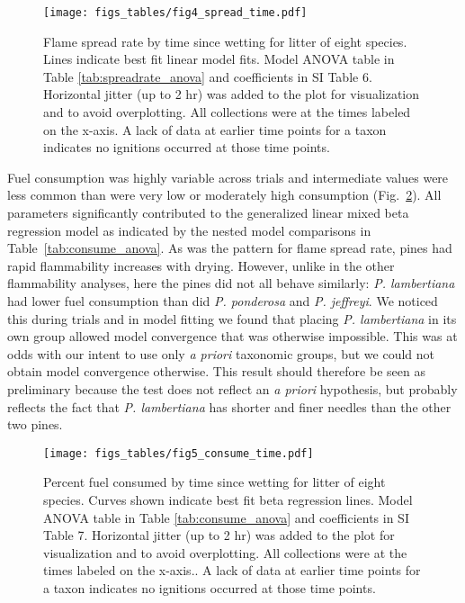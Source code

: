 \documentclass[letterpaper,12pt]{article}
\begin{document}
\begin{figure}[h]
  \centering
\texttt{[image: figs\_tables/fig4\_spread\_time.pdf]}
\caption{Flame spread rate by time since wetting for litter of eight species.
  Lines indicate best fit linear model fits. Model ANOVA table in Table
  \ref{tab:spreadrate_anova} and coefficients in SI Table 6. Horizontal jitter
  (up to 2 hr) was added to the plot for visualization and to avoid
  overplotting. All collections were at the times labeled on the x-axis. A lack
  of data at earlier time points for a taxon indicates no ignitions occurred at
  those time points.}
\label{fig:spread_time}
\end{figure}

Fuel consumption was highly variable across trials and intermediate values were
less common than were very low or moderately high consumption
(Fig.~\ref{fig:consume_time}). All parameters significantly contributed to the
generalized linear mixed beta regression model as indicated by the nested model
comparisons in Table~\ref{tab:consume_anova}. As was the pattern for flame
spread rate, pines had rapid flammability increases with drying. However,
unlike in the other flammability analyses, here the pines did not all behave
similarly: \emph{P. lambertiana} had lower fuel consumption than did \emph{P.
  ponderosa} and \emph{P. jeffreyi}. We noticed this during trials and in model
fitting we found that placing \emph{P. lambertiana} in its own group allowed
model convergence that was otherwise impossible. This was at odds with our
intent to use only \emph{a priori} taxonomic groups, but we could not obtain
model convergence otherwise. This result should therefore be seen as
preliminary because the test does not reflect an \emph{a priori} hypothesis,
but probably reflects the fact that \emph{P. lambertiana} has shorter and finer
needles than the other two pines.


\begin{figure}[h]
  \centering
\texttt{[image: figs\_tables/fig5\_consume\_time.pdf]}
\caption{Percent fuel consumed by time since wetting for litter of eight
  species. Curves shown indicate best fit beta regression lines. Model ANOVA
  table in Table \ref{tab:consume_anova} and coefficients in SI Table 7.
  Horizontal jitter (up to 2 hr) was added to the plot for visualization and to
  avoid overplotting. All collections were at the times labeled on the x-axis..
  A lack of data at earlier time points for a taxon indicates no ignitions
  occurred at those time points.}
  \label{fig:consume_time}
\end{figure}
\end{document}

